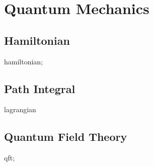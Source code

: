 \chapter{Quantum Mechanics}\label{chp:quantum_mechanics}
\minitoc

\section{Hamiltonian}
\gls{hamiltonian};

\section{Path Integral}
\gls{lagrangian}

\section{Quantum Field Theory}
\gls{qft};
